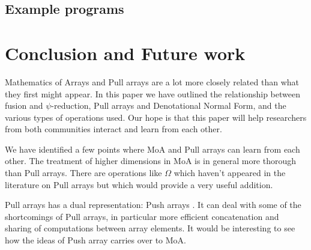 \documentclass{sigplanconf}
\begin{document}
\subsection{Example programs}

\section{Conclusion and Future work}

Mathematics of Arrays and Pull arrays are a lot more closely related
than what they first might appear. In this paper we have outlined the
relationship between fusion and \(\psi\)-reduction, Pull arrays and
Denotational Normal Form, and the various types of operations used.
Our hope is that this paper will help researchers from both
communities interact and learn from each other.

We have identified a few points where MoA and Pull arrays can learn
from each other. The treatment of higher dimensions in MoA is in
general more thorough than Pull arrays. There are operations like
$\Omega$ which haven't appeared in the literature on Pull arrays but
which would provide a very useful addition.

Pull arrays has a dual representation: Push arrays
\cite{Claessen:2012:Expressive}. It can deal with some of the
shortcomings of Pull arrays, in particular more efficient
concatenation and sharing of computations between array elements. It
would be interesting to see how the ideas of Push array carries over
to MoA.










\end{document}
